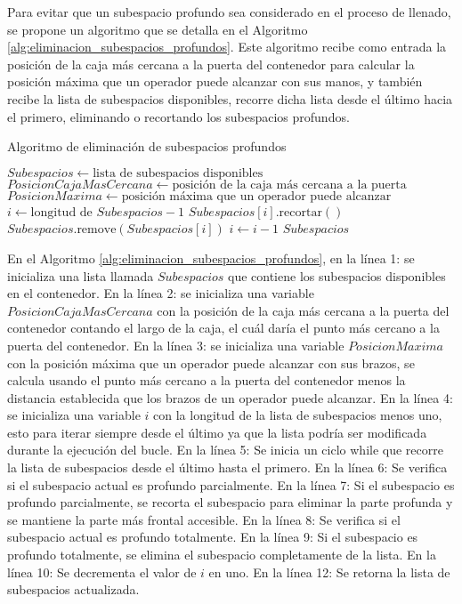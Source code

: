 Para evitar que un subespacio profundo sea considerado en el proceso de llenado, se propone un algoritmo que se detalla en el Algoritmo \ref{alg:eliminacion_subespacios_profundos}. Este algoritmo recibe como entrada la posición de la caja más cercana a la puerta del contenedor para calcular la posición máxima que un operador puede alcanzar con sus manos, y también recibe la lista de subespacios disponibles, recorre dicha lista desde el último hacia el primero, eliminando o recortando los subespacios profundos.

\begin{algorithm}[H]
\caption{Algoritmo de eliminación de subespacios profundos}
\label{alg:eliminacion_subespacios_profundos}
\begin{algorithmic}[1]
    \State $Subespacios \gets \text{lista de subespacios disponibles}$
    \State $PosicionCajaMasCercana \gets \text{posición de la caja más cercana a la puerta}$
    \State $PosicionMaxima \gets \text{posición máxima que un operador puede alcanzar}$
    \State $i \gets \text{longitud de } Subespacios - 1$
            \State $Subespacios[i].\text{recortar}()$
            \State $Subespacios.\text{remove}(Subespacios[i])$
        \EndIf
        \State $i \gets i - 1$
    \EndWhile
    \State \Return $Subespacios$
\end{algorithmic}
\end{algorithm}

En el Algoritmo \ref{alg:eliminacion_subespacios_profundos}, en la línea 1: se inicializa una lista llamada $Subespacios$ que contiene los subespacios disponibles en el contenedor. En la línea 2: se inicializa una variable $PosicionCajaMasCercana$ con la posición de la caja más cercana a la puerta del contenedor contando el largo de la caja, el cuál daría el punto más cercano a la puerta del contenedor. En la línea 3: se inicializa una variable $PosicionMaxima$ con la posición máxima que un operador puede alcanzar con sus brazos, se calcula usando el punto más cercano a la puerta del contenedor menos la distancia establecida que los brazos de un operador puede alcanzar. En la línea 4: se inicializa una variable $i$ con la longitud de la lista de subespacios menos uno, esto para iterar siempre desde el último ya que la lista podría ser modificada durante la ejecución del bucle. En la línea 5: Se inicia un ciclo while que recorre la lista de subespacios desde el último hasta el primero. En la línea 6: Se verifica si el subespacio actual es profundo parcialmente. En la línea 7: Si el subespacio es profundo parcialmente, se recorta el subespacio para eliminar la parte profunda y se mantiene la parte más frontal accesible. En la línea 8: Se verifica si el subespacio actual es profundo totalmente. En la línea 9: Si el subespacio es profundo totalmente, se elimina el subespacio completamente de la lista. En la línea 10: Se decrementa el valor de $i$ en uno. En la línea 12: Se retorna la lista de subespacios actualizada.

